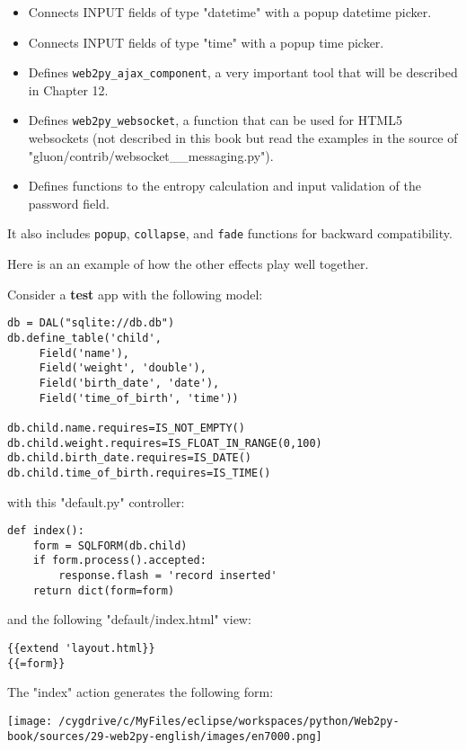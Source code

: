 \documentclass[justified,sixbynine,notoc]{tufte-book}
\def\ft{\small\tt}
\def\inxx#1{\index{#1}}
\begin{document}
\begin{fullwidth}
\begin{itemize}
\item Connects INPUT fields of type "datetime" with a popup datetime picker.

\item Connects INPUT fields of type "time" with a popup time picker.

\item Defines {\ft web2py\_ajax\_component}, a very important tool that will be described in Chapter 12.

\item Defines {\ft web2py\_websocket}, a function that can be used for HTML5 websockets (not described in this book but read the examples in the source of "gluon/contrib/websocket\_\_messaging.py"). \inxx{websockets}

\item Defines functions to the entropy calculation and input validation of the password field.
\end{itemize}

It also includes {\ft popup}, {\ft collapse}, and {\ft fade} functions for backward compatibility.

Here is an an example of how the other effects play well together.

Consider a {\bf test} app with the following model:
\begin{lstlisting}
db = DAL("sqlite://db.db")
db.define_table('child',
     Field('name'),
     Field('weight', 'double'),
     Field('birth_date', 'date'),
     Field('time_of_birth', 'time'))

db.child.name.requires=IS_NOT_EMPTY()
db.child.weight.requires=IS_FLOAT_IN_RANGE(0,100)
db.child.birth_date.requires=IS_DATE()
db.child.time_of_birth.requires=IS_TIME()
\end{lstlisting}
\noindent with this "default.py" controller:
\begin{lstlisting}
def index():
    form = SQLFORM(db.child)
    if form.process().accepted:
        response.flash = 'record inserted'
    return dict(form=form)
\end{lstlisting}
\noindent and the following "default/index.html" view:
\begin{lstlisting}[keywords={}]
{{extend 'layout.html}}
{{=form}}
\end{lstlisting}

The "index" action generates the following form:


\goodbreak\begin{center}\texttt{[image: /cygdrive/c/MyFiles/eclipse/workspaces/python/Web2py-book/sources/29-web2py-english/images/en7000.png]}\end{center}



\end{fullwidth}
\end{document}
